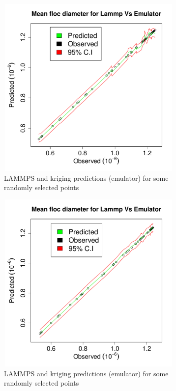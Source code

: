 \documentclass[12pt,titlepage]{report}
\theoremstyle{definition}
\theoremstyle{remark}
\begin{document}
\begin{figure}[!ht]
\begin{subfigure}[b]{.5\textwidth}
\includegraphics[height=9cm,width=1.1\textwidth]{ana/myplot1}
\caption{LAMMPS and kriging predictions (emulator) for some randomly selected points}
\label{myfigg9a1}
\end{subfigure}\hspace*{1em}
\begin{subfigure}[b]{.5\textwidth}
\includegraphics[height=9cm,width=1.1\textwidth]{ana/myplot2}
\caption{LAMMPS and kriging predictions (emulator) for some randomly selected points}
\label{myfigg9a1}
\end{subfigure}
\begin{subfigure}[b]{.5\textwidth}

\end{subfigure}
\end{figure}
\end{document}
